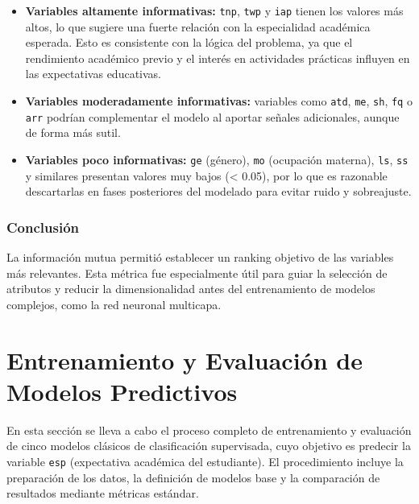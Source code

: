 \documentclass[11pt,a4paper]{article}
\begin{document}
\begin{itemize}
    \item \textbf{Variables altamente informativas:} \texttt{tnp}, \texttt{twp} y \texttt{iap} tienen los valores más altos, lo que sugiere una fuerte relación con la especialidad académica esperada. Esto es consistente con la lógica del problema, ya que el rendimiento académico previo y el interés en actividades prácticas influyen en las expectativas educativas.
    
    \item \textbf{Variables moderadamente informativas:} variables como \texttt{atd}, \texttt{me}, \texttt{sh}, \texttt{fq} o \texttt{arr} podrían complementar el modelo al aportar señales adicionales, aunque de forma más sutil.
    
    \item \textbf{Variables poco informativas:} \texttt{ge} (género), \texttt{mo} (ocupación materna), \texttt{ls}, \texttt{ss} y similares presentan valores muy bajos (< 0.05), por lo que es razonable descartarlas en fases posteriores del modelado para evitar ruido y sobreajuste.
\end{itemize}

\medskip

\subsubsection*{Conclusión}

La información mutua permitió establecer un ranking objetivo de las variables más relevantes. Esta métrica fue especialmente útil para guiar la selección de atributos y reducir la dimensionalidad antes del entrenamiento de modelos complejos, como la red neuronal multicapa.

\section{Entrenamiento y Evaluación de Modelos Predictivos}

En esta sección se lleva a cabo el proceso completo de entrenamiento y evaluación de cinco modelos clásicos de clasificación supervisada, cuyo objetivo es predecir la variable \texttt{esp} (expectativa académica del estudiante). El procedimiento incluye la preparación de los datos, la definición de modelos base y la comparación de resultados mediante métricas estándar.

\medskip
\end{document}
